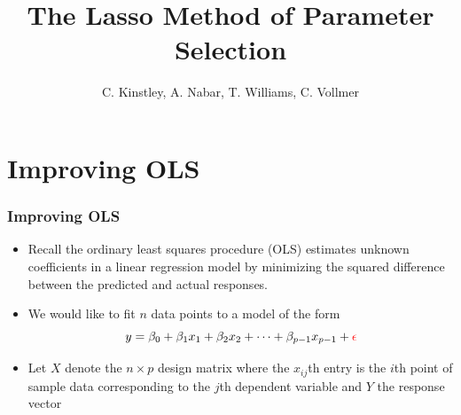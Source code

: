 \documentclass{beamer}
\begin{document}
\title{The Lasso Method of Parameter Selection}
\author{C. Kinstley, A. Nabar, T. Williams, C. Vollmer }
\frame{\titlepage}

\section[Outline]{}

\section{Improving OLS}


\frame
{
\frametitle{Improving OLS}
	\begin{itemize}
	\item Recall the ordinary least squares procedure (OLS) estimates unknown coefficients in a linear regression model by minimizing the {\color{red}squared difference} between the {\color{purple}predicted} and {\color{blue}actual} responses. 
	
	\item We would like to fit $n$ data points to a model of the form {\color{purple}$$y= \beta_0 + \beta_1 x_1 + \beta_2 x_2+ \dots +\beta_{p-1} x_{p-1}+\color{red}\epsilon$$}
	
	\item Let $X$ denote the $n \times p$ design matrix where the $x_{ij}$th entry is the $i$th point of sample data corresponding to the $j$th dependent variable and $Y$ the response vector
		

	\end{itemize}
}
\end{document}
